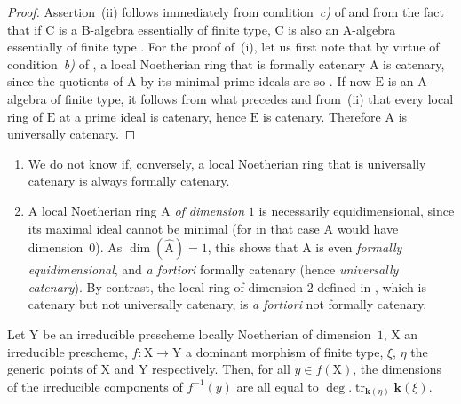 \begin{proof}
Assertion~(ii) follows immediately from condition~\emph{c)} of  and from the fact that if $\mathrm{C}$ is a B-algebra essentially of finite type, $\mathrm{C}$ is also an A-algebra essentially of finite type .
For the proof of~(i), let us first note that by virtue of condition~\emph{b)} of , a local Noetherian ring that is formally catenary $\mathrm{A}$ is catenary, since the quotients of $\mathrm{A}$ by its minimal prime ideals are so .
If now $\mathrm{E}$ is an A-algebra of finite type, it follows from what precedes and from~(ii) that every local ring of $\mathrm{E}$ at a prime ideal is catenary, hence $\mathrm{E}$ is catenary.
Therefore $\mathrm{A}$ is universally catenary.
\end{proof}


\begin{remarks}[7.1.12]
\label{IV.7.1.12}
\begin{enumerate}[label=\emph{\roman*)}]
  \item We do not know if, conversely, a local Noetherian ring that is universally catenary is always formally catenary.

  \item A local Noetherian ring $\mathrm{A}$ \emph{of dimension} $1$ is necessarily equidimensional, since its maximal ideal cannot be minimal (for in that case $\mathrm{A}$ would have dimension~$0$).
  As $\dim(\widehat{\mathrm{A}})=1$, this shows that $\mathrm{A}$ is even \emph{formally equidimensional}, and \emph{a fortiori} formally catenary (hence \emph{universally catenary}).
  By contrast, the local ring of dimension $2$ defined in , which is catenary but not universally catenary, is \emph{a fortiori} not formally catenary.
\end{enumerate}
\end{remarks}

\begin{corollary}[7.1.13]
\label{IV.7.1.13}
Let $\mathrm{Y}$ be an irreducible prescheme locally Noetherian of dimension~$1$, $\mathrm{X}$ an irreducible prescheme, $f:\mathrm{X}\to\mathrm{Y}$ a dominant morphism of finite type, $\xi$, $\eta$ the generic points of $\mathrm{X}$ and $\mathrm{Y}$ respectively.
Then, for all $y\in f(\mathrm{X})$, the dimensions of the irreducible components of $f^{-1}(y)$ are all equal to $\deg.\operatorname{tr}_{\boldsymbol{k}(\eta)}\boldsymbol{k}(\xi)$.
\end{corollary}

